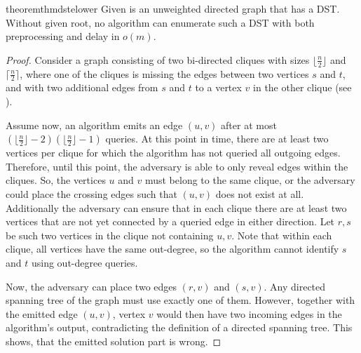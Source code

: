 \documentclass[a4paper, USenglish, cleveref, autoref, thm-restate]{lipics-v2021}
\begin{document}
\begin{restatable}{theorem}{thmdstelower}
	\label{thm:dste-lower}
	Given is an unweighted directed graph that has a DST.
	Without given root, no algorithm can enumerate such a DST with both preprocessing and delay in $o(m)$.
\end{restatable}
\begin{proof}
	Consider a graph  consisting of two bi-directed cliques with sizes $\lfloor \frac{n}{2} \rfloor$ and $\lceil \frac{n}{2} \rceil$, where one of the cliques is missing the edges between two vertices $s$ and $t$, and with two additional edges from $s$ and $t$ to a vertex $v$ in the other clique (see ).
	
	Assume now, an algorithm emits an edge $(u,v)$ after at most $(\lfloor \frac{n}{2} \rfloor-2)(\lfloor \frac{n}{2} \rfloor-1)$ queries.
	At this point in time, there are at least two vertices per clique for which the algorithm has not queried all outgoing edges.
	Therefore, until this point, the adversary is able to only reveal edges within the cliques.
	So, the vertices $u$ and $v$ must belong to the same clique, or the adversary could place the crossing edges such that $(u,v)$ does not exist at all.
	Additionally the adversary can ensure that in each clique there are at least two vertices that are not yet connected by a queried edge in either direction.
	Let $r,s$ be such two vertices in the clique not containing $u,v$.
	Note that within each clique, all vertices have the same out-degree, so the algorithm cannot identify $s$ and $t$ using out-degree queries.
	
	Now, the adversary can place two edges $(r,v)$ and $(s,v)$.
	Any directed spanning tree of the graph must use exactly one of them.
	However, together with the emitted edge $(u,v)$, vertex $v$ would then have two incoming edges in the algorithm's output, contradicting the definition of a directed spanning tree.
	This shows, that the emitted solution part is wrong.
\end{proof}
\end{document}
